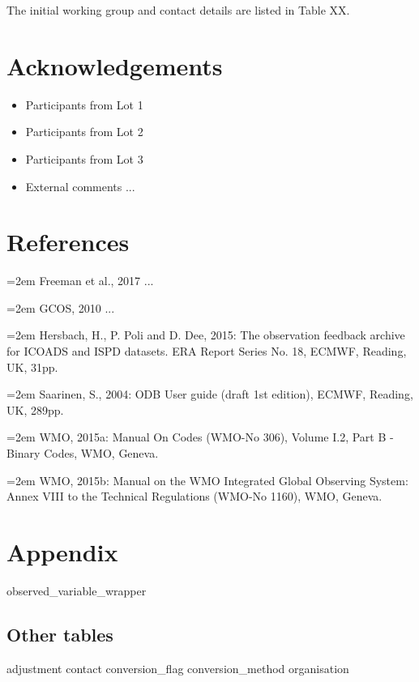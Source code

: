 \documentclass[a4paper,11pt]{article}
\begin{document}
The initial working group and contact details are listed in Table XX.

\section {Acknowledgements}
\begin{itemize}
\item Participants from Lot 1
\item Participants from Lot 2
\item Participants from Lot 3
\item External comments ...
\end{itemize}

\section {References}

\hangindent=2em Freeman et al., 2017 ...

\hangindent=2em GCOS, 2010 ...

\hangindent=2em Hersbach, H., P. Poli and D. Dee, 2015: The observation feedback archive for ICOADS and ISPD datasets. ERA Report Series No. 18, ECMWF, Reading, UK, 31pp.

\hangindent=2em Saarinen, S., 2004: ODB User guide (draft 1st edition), ECMWF, Reading, UK, 289pp.

\hangindent=2em WMO, 2015a: Manual On Codes (WMO-No 306), Volume I.2, Part B - Binary Codes, WMO, Geneva.

\hangindent=2em WMO, 2015b:  Manual on the WMO Integrated Global Observing System: Annex VIII to the Technical Regulations (WMO-No 1160), WMO, Geneva.

\section {Appendix}
 {observed_variable_wrapper}
\begin{landscape}
\subsection {Other tables}
 {adjustment}
 {contact}
 {conversion_flag}
 {conversion_method}
 {organisation}
\end{landscape}
\end{document}
